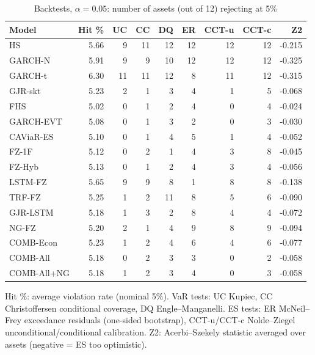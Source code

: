 \begin{table}[htbp]
\centering
\footnotesize
\caption{Backtests, $\alpha=0.05$: number of assets (out of 12) rejecting at 5\%}
\label{tab:bt_a050}
\begin{tabular}{lrrrrrrrr}
\toprule
Model & Hit \% & UC & CC & DQ & ER & CCT-u & CCT-c & Z2 \\
\midrule
HS & 5.66 & 9 & 11 & 12 & 12 & 12 & 12 & -0.215 \\
GARCH-N & 5.91 & 9 & 9 & 10 & 12 & 12 & 12 & -0.325 \\
GARCH-t & 6.30 & 11 & 11 & 12 & 8 & 11 & 12 & -0.315 \\
GJR-skt & 5.23 & 2 & 1 & 3 & 4 & 1 & 5 & -0.068 \\
FHS & 5.02 & 0 & 1 & 2 & 4 & 0 & 4 & -0.024 \\
GARCH-EVT & 5.08 & 0 & 1 & 3 & 2 & 0 & 3 & -0.030 \\
CAViaR-ES & 5.10 & 0 & 1 & 4 & 5 & 1 & 4 & -0.052 \\
FZ-1F & 5.12 & 0 & 2 & 1 & 4 & 3 & 8 & -0.045 \\
FZ-Hyb & 5.13 & 0 & 1 & 2 & 4 & 3 & 4 & -0.056 \\
LSTM-FZ & 5.65 & 9 & 9 & 8 & 1 & 8 & 8 & -0.138 \\
TRF-FZ & 5.25 & 1 & 2 & 11 & 8 & 5 & 6 & -0.090 \\
GJR-LSTM & 5.18 & 1 & 3 & 2 & 8 & 4 & 4 & -0.072 \\
NG-FZ & 5.20 & 2 & 1 & 4 & 9 & 8 & 9 & -0.094 \\
COMB-Econ & 5.23 & 1 & 2 & 4 & 6 & 4 & 6 & -0.077 \\
COMB-All & 5.18 & 0 & 2 & 3 & 3 & 0 & 2 & -0.058 \\
COMB-All+NG & 5.18 & 1 & 2 & 3 & 4 & 0 & 3 & -0.058 \\
\bottomrule
\end{tabular}
\par\smallskip\parbox{\linewidth}{\scriptsize Hit \%: average violation rate (nominal 5\%). VaR tests: UC Kupiec, CC Christoffersen conditional coverage, DQ Engle--Manganelli. ES tests: ER McNeil--Frey exceedance residuals (one-sided bootstrap), CCT-u/CCT-c Nolde--Ziegel unconditional/conditional calibration. Z2: Acerbi--Szekely statistic averaged over assets (negative = ES too optimistic).}
\end{table}